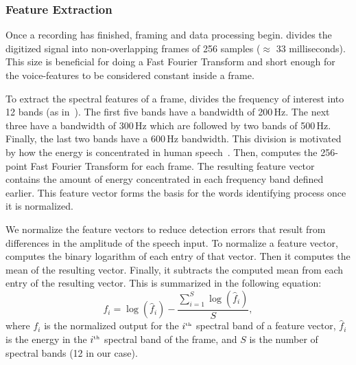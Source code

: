 \subsubsection{Feature Extraction}
Once a recording has finished, framing and data processing begin. \cim divides the digitized signal into non-overlapping frames of 256 samples ($\approx$ 33 milliseconds). This size is beneficial for doing a Fast Fourier Transform and short enough for the voice-features to be considered constant inside a frame.

To extract the spectral features of a frame, \cim divides the frequency of interest into 12 bands (as in~\cite{hopper1992fft}). The first five bands have a bandwidth of 200\,Hz. The next three have a bandwidth of 300\,Hz which are followed by two bands of 500\,Hz. Finally, the last two bands have a 600\,Hz bandwidth. This division is motivated by how the energy is concentrated in human speech~\cite{hopper1992fft}. Then, \cim computes the 256-point Fast Fourier Transform for each frame. The resulting feature vector contains the amount of energy concentrated in each frequency band defined earlier. This feature vector forms the basis for the words identifying process once it is normalized.

We normalize the feature vectors to reduce detection errors that result from differences in the amplitude of the speech input. To normalize a feature vector, \cim computes the binary logarithm of each entry of that vector. 
Then it computes the mean of the resulting vector. Finally, it subtracts the computed mean from each entry of the resulting vector. This is summarized in the following equation: 
\begin{equation}
    f_i = \log(\hat{f}_i) - \frac{\sum\limits^S_{i=1}\log(\hat{f}_i)}{S},
\end{equation}
where $f_i$ is the normalized output for the $i^{\text{\tiny th}}$ spectral band of a feature vector, $\hat{f}_i$ is the energy in the $i^{\text{\tiny th}}$ spectral band of the frame, and $S$ is the number of spectral bands (12 in our case). 


